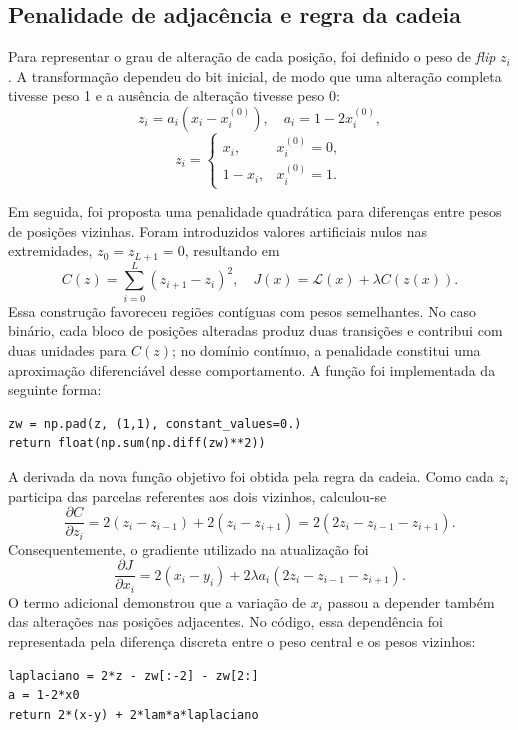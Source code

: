 \documentclass[conference,a4paper]{IEEEtran}
\begin{document}
\subsection{Penalidade de adjacência e regra da cadeia}
Para representar o grau de alteração de cada posição, foi definido o peso de \textit{flip} $z_i$. A transformação dependeu do bit inicial, de modo que uma alteração completa tivesse peso 1 e a ausência de alteração tivesse peso 0:
\begin{equation}
 z_i=a_i(x_i-x_i^{(0)}), \quad a_i=1-2x_i^{(0)},
\end{equation}
\vspace{-.8em}
\begin{equation}
z_i=\begin{cases}x_i,&x_i^{(0)}=0,\\1-x_i,&x_i^{(0)}=1.\end{cases}
\end{equation}

Em seguida, foi proposta uma penalidade quadrática para diferenças entre pesos de posições vizinhas. Foram introduzidos valores artificiais nulos nas extremidades, $z_0=z_{L+1}=0$, resultando em
\begin{equation}
\boxed{C(z)=\sum_{i=0}^{L}(z_{i+1}-z_i)^2}, \quad
J(x)=\mathcal{L}(x)+\lambda C(z(x)).
\end{equation}
Essa construção favoreceu regiões contíguas com pesos semelhantes. No caso binário, cada bloco de posições alteradas produz duas transições e contribui com duas unidades para $C(z)$; no domínio contínuo, a penalidade constitui uma aproximação diferenciável desse comportamento. A função foi implementada da seguinte forma:
\begin{lstlisting}
zw = np.pad(z, (1,1), constant_values=0.)
return float(np.sum(np.diff(zw)**2))
\end{lstlisting}

A derivada da nova função objetivo foi obtida pela regra da cadeia. Como cada $z_i$ participa das parcelas referentes aos dois vizinhos, calculou-se
\begin{equation}
\frac{\partial C}{\partial z_i}
=2(z_i-z_{i-1})+2(z_i-z_{i+1})
=2(2z_i-z_{i-1}-z_{i+1}).
\end{equation}
Consequentemente, o gradiente utilizado na atualização foi
\begin{equation}
\boxed{\frac{\partial J}{\partial x_i}
=2(x_i-y_i)+2\lambda a_i
(2z_i-z_{i-1}-z_{i+1}).}
\end{equation}
O termo adicional demonstrou que a variação de $x_i$ passou a depender também das alterações nas posições adjacentes. No código, essa dependência foi representada pela diferença discreta entre o peso central e os pesos vizinhos:
\begin{lstlisting}
laplaciano = 2*z - zw[:-2] - zw[2:]
a = 1-2*x0
return 2*(x-y) + 2*lam*a*laplaciano
\end{lstlisting}
\end{document}
